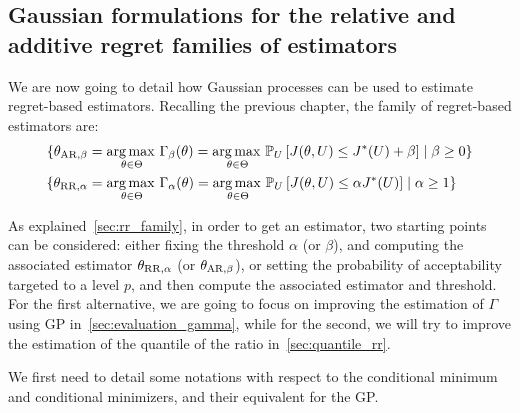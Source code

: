 \documentclass[../../Main_ManuscritThese.tex]{subfiles}
\begin{document}

\subsection{Gaussian formulations for the relative and additive regret families of estimators}
\label{ssec:gp_delta_alpha}

We are now going to detail how Gaussian processes can be used to
estimate regret-based estimators.  Recalling the previous chapter, the
family of regret-based estimators are:
\begin{align}
  \{ {\theta}_{\mathrm{AR,\beta}} &= \operatorname*{arg\,max \,}_{\theta\in\Theta} \Gamma_\beta(\theta) = \operatorname*{arg\,max \,}_{\theta\in\Theta} \mathbb{P}_{U}\left[J(\theta, U) \leq J^*(U) + \beta \right] \mid \beta \geq 0 \} \\
  \{ {\theta}_{\mathrm{RR,\alpha}} &= \operatorname*{arg\,max \,}_{\theta\in\Theta} \Gamma_\alpha(\theta) = \operatorname*{arg\,max \,}_{\theta\in\Theta}\mathbb{P}_{U}\left[J(\theta, U) \leq \alpha J^*(U)\right] \mid \alpha \geq 1 \}
\end{align}

As explained~\cref{sec:rr_family}, in order to get an estimator, two starting points can be considered: either fixing the threshold $\alpha$ (or $\beta$), and computing the associated estimator ${\theta}_{\mathrm{RR,\alpha}}$ (or ${\theta}_{\mathrm{AR,\beta}}$), or setting the probability of acceptability targeted to a level $p$, and then compute the associated estimator and threshold. For the first alternative, we are going to focus on improving the estimation of $\Gamma$ using GP in~\cref{sec:evaluation_gamma}, while for the second, we will try to improve the estimation of the quantile of the ratio in~\cref{sec:quantile_rr}.


We first need to detail some notations with respect to the conditional
minimum and conditional minimizers, and their equivalent for the GP.
\end{document}
